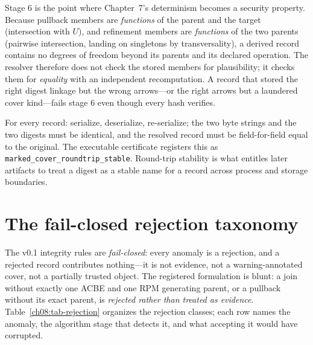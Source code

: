 \begin{remark}\label{ch08:rem-recompute}
Stage 6 is the point where Chapter~7's determinism becomes a security property. Because pullback members are \emph{functions} of the parent and the target (intersection with $U$), and refinement members are \emph{functions} of the two parents (pairwise intersection, landing on singletons by transversality), a derived record contains no degrees of freedom beyond its parents and its declared operation. The resolver therefore does not check the stored members for plausibility; it checks them for \emph{equality} with an independent recomputation. A record that stored the right digest linkage but the wrong arrows---or the right arrows but a laundered cover kind---fails stage 6 even though every hash verifies.
\end{remark}

\begin{protocol}\label{ch08:proto-roundtrip}
For every record: serialize, deserialize, re-serialize; the two byte strings and the two digests must be identical, and the resolved record must be field-for-field equal to the original. The executable certificate registers this as \texttt{marked\_cover\_roundtrip\_stable}. Round-trip stability is what entitles later artifacts to treat a digest as a stable name for a record across process and storage boundaries.
\end{protocol}

\section{The fail-closed rejection taxonomy}\label{ch08:sec-rejection}

The v0.1 integrity rules are \emph{fail-closed}: every anomaly is a rejection, and a rejected record contributes nothing---it is not evidence, not a warning-annotated cover, not a partially trusted object. The registered formulation is blunt: a join without exactly one ACBE and one RPM generating parent, or a pullback without its exact parent, is \emph{rejected rather than treated as evidence}. Table~\ref{ch08:tab-rejection} organizes the rejection classes; each row names the anomaly, the algorithm stage that detects it, and what accepting it would have corrupted.

